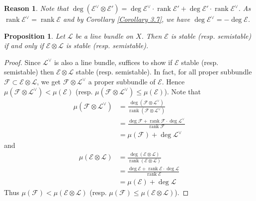 \documentclass{ctexart}
\newtheorem{proposition}{Proposition}[section]
\newtheorem{reason}{Reason}[section]
\newcommand{\rank}{\operatorname{rank}}
\begin{document}
\begin{reason}
    Note that $\deg (\mathcal{E}^{\vee} \otimes \mathcal{E}')  = \deg \mathcal{E}^{\vee} \cdot \rank \mathcal{E}' + \deg \mathcal{E}' \cdot \rank \mathcal{E}^{\vee}$.
    As $\rank \mathcal{E}^{\vee} = \rank \mathcal{E}$ and by Corollary \ref{Corollary 3.7}, we have $\deg \mathcal{E^{\vee}} = -\deg \mathcal{E}$.
\end{reason}
\begin{proposition}
    Let $\mathcal{L}$ be a line bundle on $X$.
    Then $\mathcal{E}$ is stable (resp. semistable) if and only if $\mathcal{E} \otimes \mathcal{L}$ is stable (resp. semistable).
    \label{Proposition 6.3}
\end{proposition}
\begin{proof}
    Since $\mathcal{L}^{\vee}$ is also a line bundle, suffices to show if $\mathcal{E}$ stable (resp. semistable) then $\mathcal{E} \otimes \mathcal{L}$ stable (resp. semistable).
    In fact, for all proper subbundle $\mathcal{F} \subset \mathcal{E} \otimes \mathcal{L}$, we get $\mathcal{F} \otimes \mathcal{L}^{\vee}$ a proper subbundle of $\mathcal{E}$.
    Hence $\mu(\mathcal{F} \otimes \mathcal{L}^{\vee}) < \mu(\mathcal{E})$ (resp. $\mu(\mathcal{F} \otimes \mathcal{L}^{\vee}) \le \mu(\mathcal{E})$).
    Note that
    \begin{equation}
        \begin{split}
            \mu(\mathcal{F} \otimes \mathcal{L}^{\vee}) & = \frac{\deg (\mathcal{F} \otimes \mathcal{L}^{\vee})}{\rank (\mathcal{F} \otimes \mathcal{L}^{\vee})} \\
            & = \frac{\deg \mathcal{F} + \rank \mathcal{F} \cdot \deg \mathcal{L}^{\vee}}{\rank \mathcal{F}} \\
            & = \mu(\mathcal{F}) + \deg \mathcal{L}^{\vee}
        \end{split}
    \end{equation}
    and
    \begin{equation}
        \begin{split}
            \mu(\mathcal{E} \otimes \mathcal{L}) & = \frac{\deg (\mathcal{E} \otimes \mathcal{L})}{\rank (\mathcal{E} \otimes \mathcal{L})} \\
            & = \frac{\deg \mathcal{E} + \rank \mathcal{E} \cdot \deg \mathcal{L}}{\rank \mathcal{E}} \\
            & = \mu(\mathcal{E}) + \deg \mathcal{L}
        \end{split}
    \end{equation}
    Thus $\mu(\mathcal{F}) < \mu(\mathcal{E} \otimes \mathcal{L})$ (resp. $\mu(\mathcal{F}) \le \mu(\mathcal{E} \otimes \mathcal{L})$).
\end{proof}
\end{document}
